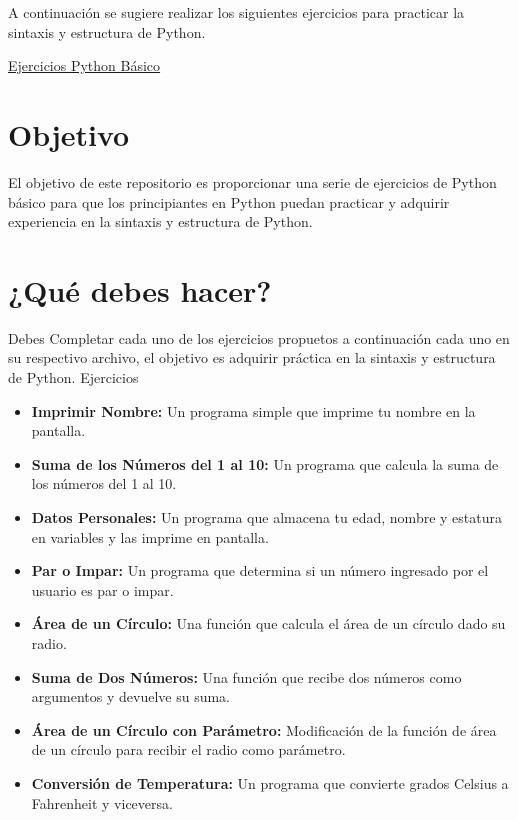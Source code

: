 \documentclass[
  a4paper,
  DIV=11,
  numbers=noendperiod,
  onepage,
  openany]{scrreprt}
\providecommand{\tightlist}{%
  \setlength{\itemsep}{0pt}\setlength{\parskip}{0pt}}\usepackage{longtable,booktabs,array}
\begin{document}
A continuación se sugiere realizar los siguientes ejercicios para
practicar la sintaxis y estructura de Python.

\href{https://classroom.github.com/a/IcerIhRU}{Ejercicios Python Básico}

\section{Objetivo}\label{objetivo}

El objetivo de este repositorio es proporcionar una serie de ejercicios
de Python básico para que los principiantes en Python puedan practicar y
adquirir experiencia en la sintaxis y estructura de Python.

\section{¿Qué debes hacer?}\label{quuxe9-debes-hacer}

Debes Completar cada uno de los ejercicios propuetos a continuación cada
uno en su respectivo archivo, el objetivo es adquirir práctica en la
sintaxis y estructura de Python. Ejercicios

\begin{itemize}
\tightlist
\item
  \textbf{Imprimir Nombre:} Un programa simple que imprime tu nombre en
  la pantalla.
\item
  \textbf{Suma de los Números del 1 al 10:} Un programa que calcula la
  suma de los números del 1 al 10.
\item
  \textbf{Datos Personales:} Un programa que almacena tu edad, nombre y
  estatura en variables y las imprime en pantalla.
\item
  \textbf{Par o Impar:} Un programa que determina si un número ingresado
  por el usuario es par o impar.
\item
  \textbf{Área de un Círculo:} Una función que calcula el área de un
  círculo dado su radio.
\item
  \textbf{Suma de Dos Números:} Una función que recibe dos números como
  argumentos y devuelve su suma.
\item
  \textbf{Área de un Círculo con Parámetro:} Modificación de la función
  de área de un círculo para recibir el radio como parámetro.
\item
  \textbf{Conversión de Temperatura:} Un programa que convierte grados
  Celsius a Fahrenheit y viceversa.
\end{itemize}
\end{document}
